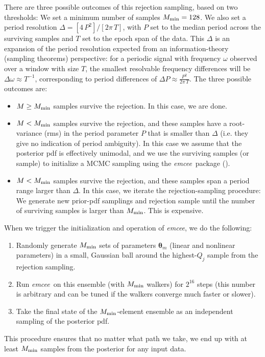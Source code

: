 \documentclass[manuscript, letterpaper]{aastex6}
\newcommand{\project}[1]{\textsl{#1}}
\newcommand{\emcee}{\project{emcee}}
\newcommand{\bs}[1]{\boldsymbol{#1}}
\newcommand{\resp}[1]{#1}
\begin{document}
There are three possible outcomes of this rejection sampling, based on two
thresholds:
We set a minimum number of samples $M_{\rm min}=128$.
We also set a period resolution $\Delta = [4\,P^2] / [2\pi\,T]$, with
$P$ set to the median period across the surviving samples and $T$ set to
the epoch span of the data.
This $\Delta$ is an expansion of the period resolution expected from an
information-theory (sampling theorems) perspective:
for a periodic signal with frequency $\omega$ observed over a window with size
$T$, the smallest resolvable frequency differences will be $\Delta\omega \approx
T^{-1}$, corresponding to period differences of $\Delta P \approx
\frac{P^2}{2\pi\,T}$.
The three possible outcomes are:
\begin{itemize}\itemsep0ex
\item $M\geq M_{\rm min}$ samples survive the rejection.
  In this case, we are done.
\item $M<M_{\rm min}$ samples survive the rejection, and these samples have a
  root-variance (rms) in the period parameter $P$ that is smaller than $\Delta$
  (i.e. they give no indication of period ambiguity).
  In this case we assume that the posterior pdf is effectively unimodal, and we
  use the surviving samples (or sample) to initialize a MCMC sampling using the
  \emcee\ package (\citealt{Foreman-Mackey:2013}).
\item $M<M_{\rm min}$ samples survive the rejection, and these samples
  span a period range larger than $\Delta$.
  In this case, we iterate the \resp{rejection-sampling} procedure: We generate
  new prior-pdf samplings and rejection sample until the number of surviving
  samples is larger than $M_{\rm min}$.
  This is expensive.
\end{itemize}
When we trigger the \resp{initialization} and operation of \emcee, we do the
following:
\begin{enumerate}\itemsep0ex
\item Randomly generate $M_{\rm min}$ sets of parameters $\bs{\theta}_m$
  (linear and nonlinear parameters) in a small, Gaussian ball around
  the highest-$Q_j$ sample from the \resp{rejection sampling}.
\item Run \emcee\ on this ensemble (with $M_{\rm min}$ walkers) for $2^{16}$
  steps \resp{(this number is arbitrary and can be tuned if the walkers converge
  much faster or slower)}.
\item Take the final state of the $M_{\rm min}$-element ensemble as an
  independent sampling of the posterior pdf.
\end{enumerate}
This procedure ensures that no matter what path we take, we end up with
at least $M_{\rm min}$ samples from the posterior for any input data.
\end{document}
